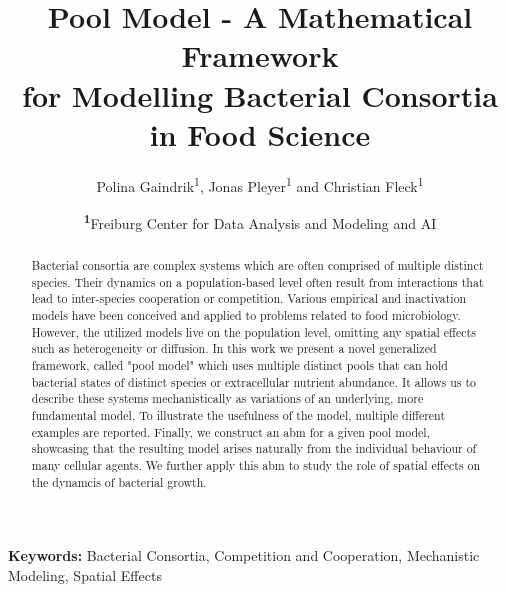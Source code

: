 \documentclass[10pt,A4paper]{article}
\title{Pool Model - A Mathematical Framework\\ for Modelling Bacterial Consortia in Food Science}
\author{
    Polina Gaindrik\textsuperscript{1},
    Jonas Pleyer\textsuperscript{1}
    and Christian Fleck\textsuperscript{1}
}
\date{
    \footnotesize
    \textsuperscript{\textbf{1}}Freiburg Center for Data Analysis and Modeling and AI
}
\numberwithin{equation}{section}
\begin{document}
\maketitle

\begin{abstract}
    Bacterial consortia are complex systems which are often comprised of multiple distinct species.
    Their dynamics on a population-based level often result from interactions that lead to
    inter-species cooperation or competition.
    Various empirical and inactivation models have been conceived and applied to problems related to
    food microbiology.
    However, the utilized models live on the population level, omitting any spatial effects such as
    heterogeneity or diffusion.
    In this work we present a novel generalized framework, called "pool model" which uses multiple
    distinct pools that can hold bacterial states of distinct species or extracellular nutrient
    abundance.
    It allows us to describe these systems mechanistically as variations of an underlying, more
    fundamental model.
    To illustrate the usefulness of the model, multiple different examples are reported.
    Finally, we construct an \acl{abm} for a given pool model, showcasing that the resulting model
    arises naturally from the individual behaviour of many cellular agents.
    We further apply this \ac{abm} to study the role of spatial effects on the dynamcis of bacterial
    growth.
\end{abstract}

\textbf{Keywords:}
Bacterial Consortia, Competition and Cooperation, Mechanistic Modeling, Spatial Effects

\newpage
\tableofcontents
\end{document}
